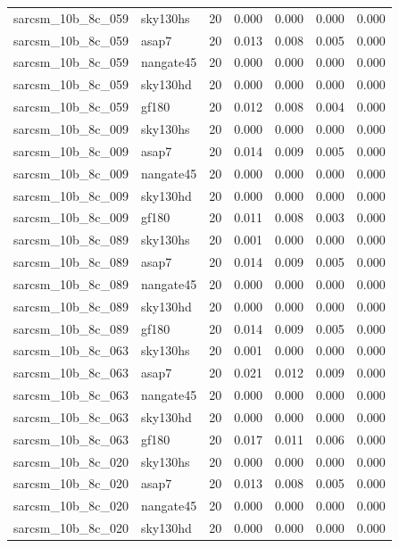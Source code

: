\begin{tabular}{llrrrrr}
sarcsm\_10b\_8c\_059 & sky130hs & 20 & 0.000 & 0.000 & 0.000 & 0.000 \\
sarcsm\_10b\_8c\_059 & asap7 & 20 & 0.013 & 0.008 & 0.005 & 0.000 \\
sarcsm\_10b\_8c\_059 & nangate45 & 20 & 0.000 & 0.000 & 0.000 & 0.000 \\
sarcsm\_10b\_8c\_059 & sky130hd & 20 & 0.000 & 0.000 & 0.000 & 0.000 \\
sarcsm\_10b\_8c\_059 & gf180 & 20 & 0.012 & 0.008 & 0.004 & 0.000 \\
sarcsm\_10b\_8c\_009 & sky130hs & 20 & 0.000 & 0.000 & 0.000 & 0.000 \\
sarcsm\_10b\_8c\_009 & asap7 & 20 & 0.014 & 0.009 & 0.005 & 0.000 \\
sarcsm\_10b\_8c\_009 & nangate45 & 20 & 0.000 & 0.000 & 0.000 & 0.000 \\
sarcsm\_10b\_8c\_009 & sky130hd & 20 & 0.000 & 0.000 & 0.000 & 0.000 \\
sarcsm\_10b\_8c\_009 & gf180 & 20 & 0.011 & 0.008 & 0.003 & 0.000 \\
sarcsm\_10b\_8c\_089 & sky130hs & 20 & 0.001 & 0.000 & 0.000 & 0.000 \\
sarcsm\_10b\_8c\_089 & asap7 & 20 & 0.014 & 0.009 & 0.005 & 0.000 \\
sarcsm\_10b\_8c\_089 & nangate45 & 20 & 0.000 & 0.000 & 0.000 & 0.000 \\
sarcsm\_10b\_8c\_089 & sky130hd & 20 & 0.000 & 0.000 & 0.000 & 0.000 \\
sarcsm\_10b\_8c\_089 & gf180 & 20 & 0.014 & 0.009 & 0.005 & 0.000 \\
sarcsm\_10b\_8c\_063 & sky130hs & 20 & 0.001 & 0.000 & 0.000 & 0.000 \\
sarcsm\_10b\_8c\_063 & asap7 & 20 & 0.021 & 0.012 & 0.009 & 0.000 \\
sarcsm\_10b\_8c\_063 & nangate45 & 20 & 0.000 & 0.000 & 0.000 & 0.000 \\
sarcsm\_10b\_8c\_063 & sky130hd & 20 & 0.000 & 0.000 & 0.000 & 0.000 \\
sarcsm\_10b\_8c\_063 & gf180 & 20 & 0.017 & 0.011 & 0.006 & 0.000 \\
sarcsm\_10b\_8c\_020 & sky130hs & 20 & 0.000 & 0.000 & 0.000 & 0.000 \\
sarcsm\_10b\_8c\_020 & asap7 & 20 & 0.013 & 0.008 & 0.005 & 0.000 \\
sarcsm\_10b\_8c\_020 & nangate45 & 20 & 0.000 & 0.000 & 0.000 & 0.000 \\
sarcsm\_10b\_8c\_020 & sky130hd & 20 & 0.000 & 0.000 & 0.000 & 0.000 \\

\end{tabular}
